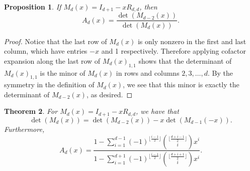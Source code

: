 \documentclass{amsart}
\newtheorem{theorem}{Theorem}[section]
\newtheorem{proposition}[theorem]{Proposition}
\theoremstyle{definition}
\begin{document}
\begin{proposition}\label{prop:CramersRuleAd}
    If $M_d(x)=I_{d+1}-xR_{d,d}$, then
    \[A_d(x)=\frac{\det(M_{d-2}(x))}{\det(M_d(x))}.\]

        \label{prop:det}
\end{proposition}

\begin{proof}
Notice that the last row of $M_d(x)$ is only nonzero in the first and last column, which have entries $-x$ and 1 respectively. Therefore applying cofactor expansion along the last row of $M_d(x)_{1,1}$ shows that the determinant of $M_d(x)_{1,1}$ is the minor of $M_{d}(x)$ in rows and columns $2,3,\ldots,d$. By the symmetry in the definition of $M_d(x)$, we see that this minor is exactly the determinant of $M_{d-2}(x)$, as desired.
\end{proof}


\begin{theorem}\label{thm:gen_fun_formula}
    For $M_d(x)=I_{d+1}-xR_{d,d}$, we have that
    \[\det(M_d(x))=\det(M_{d-2}(x))-x\det(M_{d-1}(-x)).\]
    Furthermore,
    \[A_d(x)=\frac{1 - \sum_{i=1}^{d-1} (-1)^{\lfloor \frac{i-1}{2}\rfloor} {\lfloor \frac{d+i-1}{2}\rfloor \choose i}x^i}{1 - \sum_{i=1}^{d+1} (-1)^{\lfloor \frac{i-1}{2}\rfloor} {\lfloor \frac{d+i+1}{2}\rfloor \choose i}x^i}.\]
\end{theorem}
\end{document}
